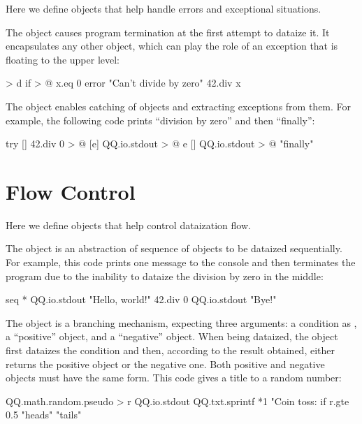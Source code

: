 \documentclass[sigplan,nonacm]{acmart}
\newcommand\aff[1]{\ff{\textcolor{gray}{\(\star\)}#1}}
\newcommand\adeff[1]{\aff{\textcolor{blue!50!black}{\textbf{#1}}}}
\begin{document}
Here we define objects that help handle errors and exceptional situations.

The \adeff{error} object causes program termination at the first attempt to dataize it.
It encapsulates any other object, which can play the role of an exception that is floating to the upper level:

\begin{ffcode}
[x] > d
  if > @
    x.eq 0
    error "Can't divide by zero"
    42.div x
\end{ffcode}

The \adeff{try} object enables catching of \aff{error} objects and extracting exceptions from them.
For example, the following code prints ``division by zero'' and then ``finally'':

\begin{ffcode}
try
  []
    42.div 0 > @
  [e]
    QQ.io.stdout > @
      e
  []
    QQ.io.stdout > @
      "finally"
\end{ffcode}

\section{Flow Control}\label{sec:flow}

Here we define objects that help control dataization flow.

The \adeff{seq} object is an abstraction of sequence of objects to be dataized sequentially.
For example, this code prints one message to the console and then terminates the program due to the inability to dataize the division by zero in the middle:

\begin{ffcode}
seq *
  QQ.io.stdout "Hello, world!"
  42.div 0
  QQ.io.stdout "Bye!"
\end{ffcode}

The \adeff{if} object is a branching mechanism, expecting three arguments: a
condition as , a ``positive'' object, and a ``negative'' object. When
being dataized, the object \aff{if} first dataizes the condition and then,
according to the result obtained, either returns the positive object or the
negative one. Both positive and negative objects must have the same form. This
code gives a title to a random number:

\begin{ffcode}
QQ.math.random.pseudo > r
QQ.io.stdout
  QQ.txt.sprintf *1
    "Coin toss: %
    if
      r.gte 0.5
      "heads"
      "tails"
\end{ffcode}
\end{document}
